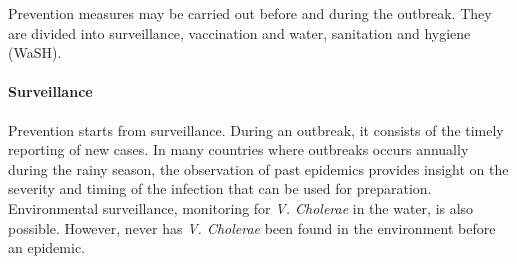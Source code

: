 Prevention measures may be carried out before and during the outbreak. They are divided into surveillance, vaccination and water, sanitation and hygiene (WaSH).

\paragraph{Surveillance} Prevention starts from surveillance. During an outbreak, it consists of the timely reporting of new cases. In many countries where outbreaks occurs annually during the rainy season, the observation of past epidemics provides insight on the severity and timing of the infection that can be used for preparation\cite{Baracchini:SeasonalityCholeraDynamics:2017}. Environmental surveillance, monitoring for \textit{V. Cholerae} in the water, is also possible. However, never has \textit{V. Cholerae} been found in the environment before an epidemic.



